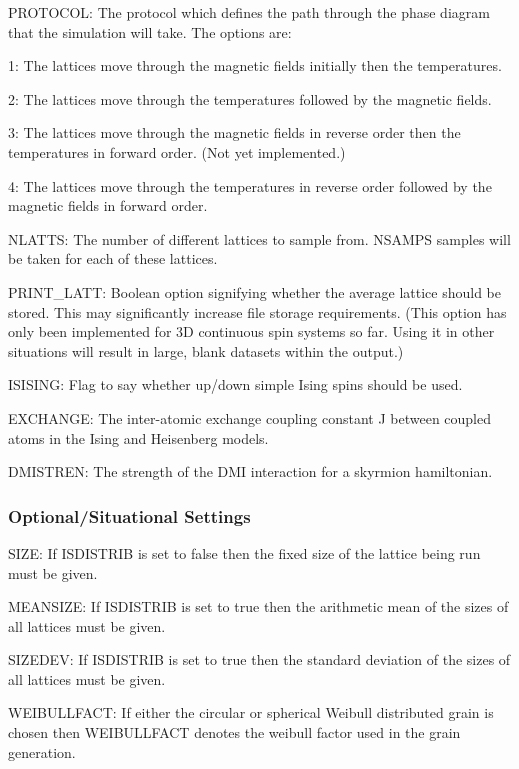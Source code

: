 \begin{DoxyItemize}
\item P\+R\+O\+T\+O\+C\+OL\+: The protocol which defines the path through the phase diagram that the simulation will take. The options are\+:
\begin{DoxyItemize}
\item 1\+: The lattices move through the magnetic fields initially then the temperatures.
\item 2\+: The lattices move through the temperatures followed by the magnetic fields.
\item 3\+: The lattices move through the magnetic fields in reverse order then the temperatures in forward order. (Not yet implemented.)
\item 4\+: The lattices move through the temperatures in reverse order followed by the magnetic fields in forward order.
\end{DoxyItemize}
\item N\+L\+A\+T\+TS\+: The number of different lattices to sample from. N\+S\+A\+M\+PS samples will be taken for each of these lattices.
\item P\+R\+I\+N\+T\+\_\+\+L\+A\+TT\+: Boolean option signifying whether the average lattice should be stored. This may significantly increase file storage requirements. (This option has only been implemented for 3D continuous spin systems so far. Using it in other situations will result in large, blank datasets within the output.)
\item I\+S\+I\+S\+I\+NG\+: Flag to say whether up/down simple Ising spins should be used.
\item E\+X\+C\+H\+A\+N\+GE\+: The inter-\/atomic exchange coupling constant J between coupled atoms in the Ising and Heisenberg models.
\item D\+M\+I\+S\+T\+R\+EN\+: The strength of the D\+MI interaction for a skyrmion hamiltonian.
\end{DoxyItemize}

\subsubsection*{Optional/\+Situational Settings}


\begin{DoxyItemize}
\item S\+I\+ZE\+: If I\+S\+D\+I\+S\+T\+R\+IB is set to false then the fixed size of the lattice being run must be given.
\item M\+E\+A\+N\+S\+I\+ZE\+: If I\+S\+D\+I\+S\+T\+R\+IB is set to true then the arithmetic mean of the sizes of all lattices must be given.
\item S\+I\+Z\+E\+D\+EV\+: If I\+S\+D\+I\+S\+T\+R\+IB is set to true then the standard deviation of the sizes of all lattices must be given.
\item W\+E\+I\+B\+U\+L\+L\+F\+A\+CT\+: If either the circular or spherical Weibull distributed grain is chosen then W\+E\+I\+B\+U\+L\+L\+F\+A\+CT denotes the weibull factor used in the grain generation.
\end{DoxyItemize}

